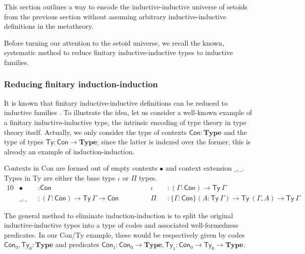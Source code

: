 \documentclass[autoref]{llncs}
\newcommand{\GG}{\Gamma}
\newcommand{\mType}{\mathbf{Type}}
\begin{document}
This section outlines a way to encode the inductive-inductive universe of
setoids from the previous section without assuming arbitrary inductive-inductive
definitions in the metatheory.

Before turning our attention to the setoid universe, we recall the known,
systematic method to reduce finitary inductive-inductive types to inductive
families.

\subsubsection{Reducing finitary induction-induction}

It is known that finitary inductive-inductive definitions can be reduced to
inductive families \cite{iit-erasure,iit-to-ix,induction-is-enough}.
%
To illustrate the idea, let us consider a well-known example of a finitary
inductive-inductive type, the intrinsic encoding of type theory in type theory
itself. Actually, we only consider the type of contexts $\textsf{Con} :
\mType$ and the type of types $\textsf{Ty} : \textsf{Con} \to \mType$; since the
latter is indexed over the former, this is already an example of
induction-induction.

Contexts in \textsf{Con} are formed out of empty contexts $\bullet$ and context
extension $\_,\_$. Types in \textsf{Ty} are either the base type $\iota$ or
$\Pi$ types.
\vspace{-0.2em}
\begin{alignat*}{10}
  & \bullet && : \textsf{Con}                                                          &&  \iota && : (\GG : \textsf{Con}) \to \textsf{Ty}\ \GG \\
  & \_,\_ && : (\GG : \textsf{Con}) \to \textsf{Ty}\ \GG \to \textsf{Con} \hspace{3em} &&  \Pi && : \{\GG : \textsf{Con}\} (A : \textsf{Ty}\ \GG) \to \textsf{Ty}\ (\GG , A) \to \textsf{Ty}\ \GG
\end{alignat*}

The general method to eliminate induction-induction is to split the original
inductive-inductive types into a type of codes and associated well-formedness
predicates. In our \textsf{Con/Ty} example, these would be respectively given by
codes $\textsf{Con}_0, \textsf{Ty}_0 : \mType$ and predicates $\textsf{Con}_1 :
\textsf{Con}_0 \to \mType, \textsf{Ty}_1 : \textsf{Con}_0 \to \textsf{Ty}_0 \to
\mType$.
\end{document}
